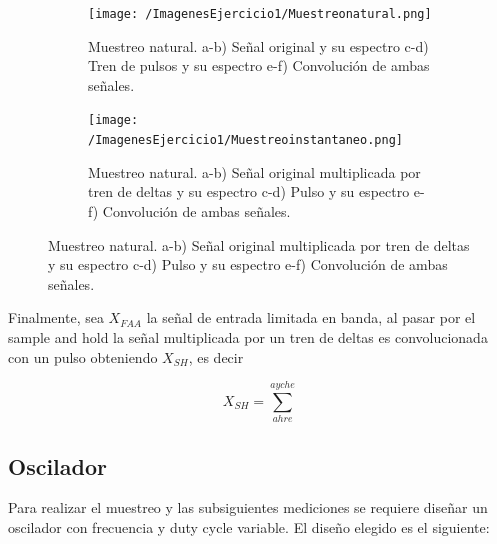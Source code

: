 \begin{figure}[H]
\centering
\begin{subfigure}[b]{.45\linewidth}
\texttt{[image: /ImagenesEjercicio1/Muestreonatural.png]}
\caption{Muestreo natural. a-b) Señal original y su espectro c-d) Tren de pulsos y su espectro e-f) Convolución de ambas señales.}
\label{fig:muestreonatural}
\end{subfigure}

\begin{subfigure}[b]{.45\linewidth}
\texttt{[image: /ImagenesEjercicio1/Muestreoinstantaneo.png]}
\caption{Muestreo natural. a-b) Señal original multiplicada por tren de deltas y su espectro c-d) Pulso y su espectro e-f) Convolución de ambas señales.}
\label{fig:muestreoinstantaneo}
\end{subfigure}
\end{figure}

Finalmente, sea $X_{FAA}$ la señal de entrada limitada en banda, al pasar por el sample and hold la señal multiplicada por un tren de deltas es convolucionada con un pulso obteniendo $X_{SH}$, es decir

\begin{equation}
X_{SH} = \sum_{ahre}^{ayche}
\end{equation}

\subsection{Oscilador}

Para realizar el muestreo y las subsiguientes mediciones se requiere diseñar un oscilador con frecuencia y duty cycle variable. El diseño elegido es el siguiente:


